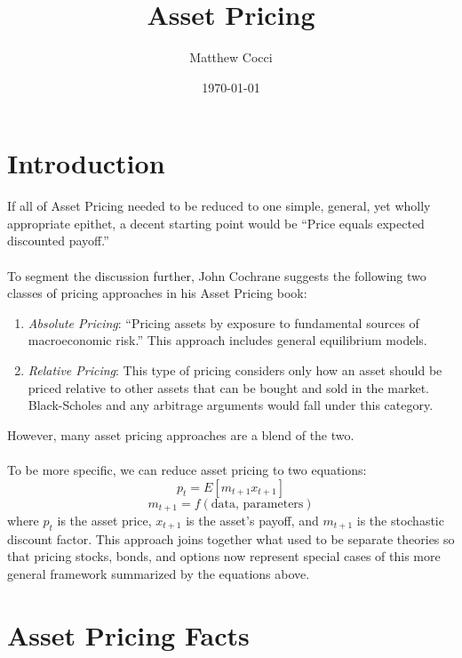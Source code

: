 \documentclass[a4paper,12pt]{scrartcl}
\author{Matthew Cocci}
\title{Asset Pricing}
\date{\today}
\begin{document}
\maketitle

\tableofcontents %

\newpage
\section{Introduction}

If all of Asset Pricing needed to be reduced to one simple,
general, yet wholly appropriate epithet, a decent starting
point would be ``Price equals expected discounted payoff.''
\\
\\
To segment the discussion further, John Cochrane suggests the
following two classes of pricing approaches in his 
Asset Pricing book:
\begin{enumerate}
    \item {\sl Absolute Pricing}: ``Pricing assets by exposure
	to fundamental sources of macroeconomic risk.'' This
	approach includes general equilibrium models. 
    \item {\sl Relative Pricing}: This type of pricing considers
	only how an asset should be priced relative to 
	other assets that can be bought and sold in the
	market. Black-Scholes and any arbitrage arguments
	would fall under this category.
\end{enumerate}
However, many asset pricing approaches are a blend of the two.
\\
\\
To be more specific, we can reduce asset pricing to two 
equations:
\begin{equation}
    p_t = E[m_{t+1} x_{t+1} ]
\end{equation}
\begin{equation}
    m_{t+1} = f(\text{data, parameters})
\end{equation}
where $p_t$ is the asset price, $x_{t+1}$ is the asset's payoff,
and $m_{t+1}$ is the stochastic discount factor.
This approach joins together what used to be separate theories so
that pricing stocks, bonds, and options now represent special
cases of this more general framework summarized by the equations above.


\section{Asset Pricing Facts}
\end{document}
